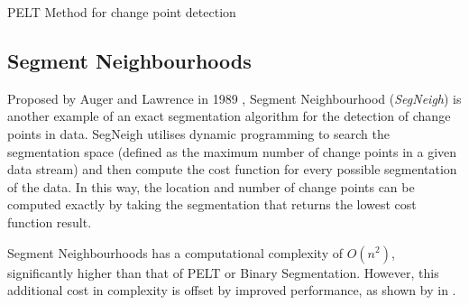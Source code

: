 \documentclass[../main.tex]{subfiles}
\begin{document}
\begin{algorithm}[H]
    \label{alg:pelt}
    \caption{PELT Method for change point detection}
    \DontPrintSemicolon
    \bigskip
\end{algorithm}

\subsection{Segment Neighbourhoods}

Proposed by Auger and Lawrence in 1989 \cite{Auger1989}, Segment Neighbourhood (\emph{SegNeigh}) is another example of an exact segmentation algorithm for the detection of change points in data. SegNeigh utilises dynamic programming to search the segmentation space (defined as the maximum number of change points in a given data stream) and then compute the cost function for every possible segmentation of the data. In this way, the location and number of change points can be computed exactly by taking the segmentation that returns the lowest cost function result.

Segment Neighbourhoods has a computational complexity of $O(n^2)$, significantly higher than that of PELT or Binary Segmentation. However, this additional cost in complexity is offset by improved performance, as shown by \citeauthor{Braun2000} in  \cite{Braun2000}.
\end{document}
